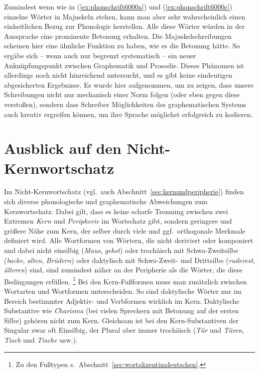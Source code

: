 Zumindest wenn wie in (\ref{ex:phonschrift6000a}) und (\ref{ex:phonschrift6000c}) einzelne Wörter in Majuskeln stehen, kann man aber sehr wahrscheinlich einen einheitlichen Bezug zur Phonologie herstellen.
Alle diese Wörter würden in der Aussprache eine prominente Betonung erhalten.
Die Majuskelschreibungen scheinen hier eine ähnliche Funktion zu haben, wie es die Betonung hätte.
So ergäbe sich -- wenn auch nur begrenzt systematisch -- ein neuer Anknüpfungspunkt zwischen Graphematik und Prosodie.
Dieses Phänomen ist allerdings noch nicht hinreichend untersucht, und es gibt keine eindeutigen abgesicherten Ergebnisse.
Es wurde hier aufgenommen, um zu zeigen, dass unsere Schreibungen nicht nur mechanisch einer Norm folgen (oder eben gegen diese verstoßen), sondern dass Schreiber Möglichkeiten des graphematischen Systems auch kreativ ergreifen können, um ihre Sprache möglichst erfolgreich zu kodieren.

\section{Ausblick auf den Nicht-Kernwortschatz}

\label{sec:nichtkernschreib}

Im Nicht-Kernwortschatz (vgl.\ auch Abschnitt~\ref{sec:kernundperipherie}) finden sich diverse phonologische und graphematische Abweichungen zum Kernwortschatz.
Dabei gilt, dass es keine scharfe Trennung zwischen zwei Extremen \textit{Kern} und \textit{Peripherie} im Wortschatz gibt, sondern geringere und größere Nähe zum Kern, der selber durch viele und ggf.\ orthogonale Merkmale definiert wird.
Alle Wortformen von Wörtern, die nicht deriviert oder komponiert und dabei nicht einsilbig (\textit{Maus}, \textit{gehst}) oder trochäisch mit Schwa-Zweitsilbe (\textit{backe}, \textit{alten}, \textit{Brüdern}) oder daktylisch mit Schwa-Zweit- und Drittsilbe (\textit{ruderest}, \textit{älteren}) sind, sind zumindest näher an der Peripherie als die Wörter, die diese Bedingungen erfüllen.%
\footnote{Zu den Fußtypen s.\ Abschnitt~\ref{sec:wortakzentimdeutschen}.}
Bei den Kern-Fußformen muss man zusätzlich zwischen Wortarten und Wortformen unterscheiden.
So sind \zB daktylische Wörter nur im Bereich bestimmter Adjektiv- und Verbformen wirklich im Kern.
Daktylische Substantive wie \textit{Charisma} \textipa{[ka.KIs.ma]} (bei vielen Sprechern mit Betonung auf der ersten Silbe) gehören nicht zum Kern.
Gleichsam ist bei den Kern-Substantiven der Singular zwar oft Einsilbig, der Plural aber immer trochäisch (\textit{Tür} und \textit{Türen}, \textit{Tisch} und \textit{Tische} usw.).

